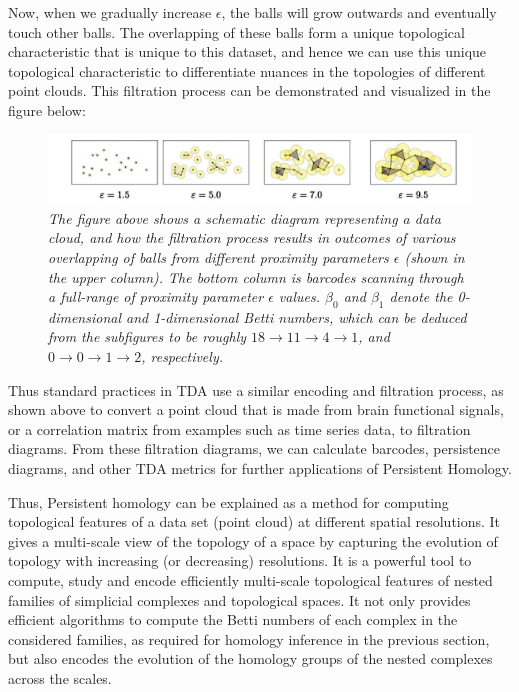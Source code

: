 Now, when we gradually increase $\epsilon$, the balls will grow outwards and eventually touch other balls. The overlapping of these balls form a unique topological characteristic that is unique to this dataset, and hence we can use this unique topological characteristic to differentiate nuances in the topologies of different point clouds. This filtration process can be demonstrated and visualized in the figure below:\cite{06.2_carlsson2009Multipersistence}

\begin{figure}[H]
	\centering
        \includegraphics[width=1.0\linewidth]{images/Persitent Homology Point Cloud Filtration Process.jpg}
	\caption{\textit{The figure above shows a schematic diagram representing a data cloud, and how the filtration process results in outcomes of various overlapping of balls from different proximity parameters $\epsilon$ (shown in the upper column). The bottom column is barcodes scanning through a full-range of proximity parameter $\epsilon$ values. $\beta_0$ and  $\beta_1$ denote the 0-dimensional and 1-dimensional Betti numbers, which can be deduced from the subfigures to be roughly $18\rightarrow11\rightarrow4\rightarrow1$, and $0\rightarrow0\rightarrow1\rightarrow2$, respectively.}}
	\label{fig:example_pipeline_fig}
\end{figure}

Thus standard practices in TDA use a similar  encoding and filtration process, as shown above to convert a point cloud that is made from brain functional signals, or a correlation matrix from examples such as time series data, to filtration diagrams. From these filtration diagrams, we can calculate barcodes, persistence diagrams, and other TDA metrics for further applications of Persistent Homology.\cite{03.4_2008localizedHomology}\cite{03.3_de2007PersistentHomology}

Thus, Persistent homology can be explained  as a method for computing topological features of a data set (point cloud) at different spatial resolutions. It gives a multi-scale view of the topology of a space by capturing the evolution of topology with increasing (or decreasing) resolutions. It  is a powerful tool to compute, study and encode efficiently multi-scale topological features of nested families of simplicial complexes and topological spaces. It not only provides efficient algorithms to compute the Betti numbers of each complex in the considered families, as required for homology inference in the previous section, but also encodes the evolution of the homology groups of the nested complexes across the scales.\cite{03.2_2008FindingHomology}\cite{03.3_de2007PersistentHomology}\cite{09.2_chazal2008CompGeometry} \cite{11.0_chazal2017TopoDataScience}

